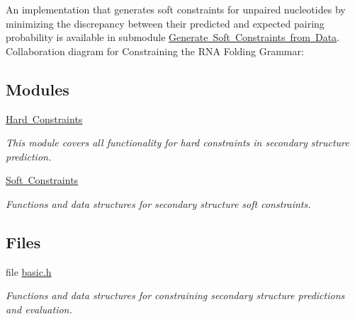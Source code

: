 An implementation that generates soft constraints for unpaired nucleotides by minimizing the discrepancy between their predicted and expected pairing probability is available in submodule \mbox{\hyperlink{group__perturbation}{Generate Soft Constraints from Data}}. Collaboration diagram for Constraining the R\+NA Folding Grammar\+:
\subsection*{Modules}
\begin{DoxyCompactItemize}
\item 
\mbox{\hyperlink{group__hard__constraints}{Hard Constraints}}
\begin{DoxyCompactList}\small\item\em This module covers all functionality for hard constraints in secondary structure prediction. \end{DoxyCompactList}\item 
\mbox{\hyperlink{group__soft__constraints}{Soft Constraints}}
\begin{DoxyCompactList}\small\item\em Functions and data structures for secondary structure soft constraints. \end{DoxyCompactList}\end{DoxyCompactItemize}
\subsection*{Files}
\begin{DoxyCompactItemize}
\item 
file \mbox{\hyperlink{constraints_2basic_8h}{basic.\+h}}
\begin{DoxyCompactList}\small\item\em Functions and data structures for constraining secondary structure predictions and evaluation. \end{DoxyCompactList}\end{DoxyCompactItemize}
